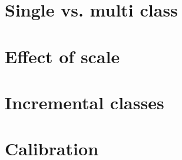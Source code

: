 \section {Single vs. multi class}


\section {Effect of scale}


\section {Incremental classes}


\section {Calibration}